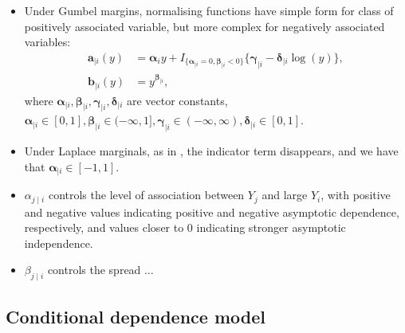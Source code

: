 \documentclass{article}
\numberwithin{equation}{section}
\begin{document}
\begin{itemize}
  \item Under Gumbel margins, normalising functions have simple form for class of positively associated variable, but more complex for negatively associated variables:
    \begin{align*}
      \bm{a}_{\mid i}(y) &= \bm{\alpha}_i y + I_{\{\bm{\alpha}_{\mid i} = 0, \bm{\beta}_{\mid i} < 0\}}\{\bm{\gamma}_{\mid i} - \bm{\delta}_{\mid i}\log(y)\}, \\
      \bm{b}_{\mid i}(y) &= y^{\bm{\beta}_{\mid i}}, 
    \end{align*}
    where $\bm{\alpha}_{\mid i}, \bm{\beta}_{\mid i}, \bm{\gamma}_{\mid i}, \bm{\delta}_{\mid i}$ are vector constants, $\bm{\alpha}_{\mid i} \in [0, 1], \bm{\beta}_{\mid i} \in (-\infty, 1], \bm{\gamma}_{\mid i} \in (-\infty, \infty) , \bm{\delta}_{\mid i} \in [0, 1]$. 
  \item Under Laplace marginals, as in \cite{Keef2013}, the indicator term disappears, and we have that $\bm{\alpha}_{\mid i} \in [-1, 1]$. 
  \item $\alpha_{j \mid i}$ controls the level of association between $Y_j$ and large $Y_i$, with positive and negative values indicating positive and negative asymptotic dependence, respectively, and values closer to 0 indicating stronger asymptotic independence. 
  \item $\beta_{j \mid i}$ controls the spread $\ldots$ 
\end{itemize}


\subsection{Conditional dependence model}
\end{document}
